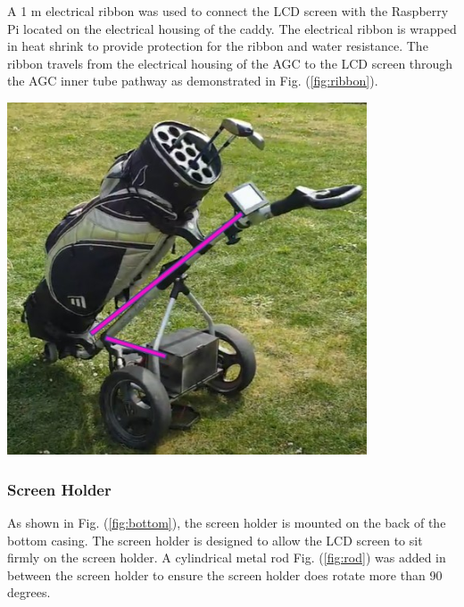 \documentclass[11pt,landscape]{article}
\newenvironment{Figure}
  {\par\medskip\noindent\minipage{\linewidth}}
  {\endminipage\par\medskip}
\begin{document}
\begin{multicols}{3}
    A 1 m electrical ribbon was used to connect the LCD screen with the
    Raspberry Pi located on the electrical housing of the caddy. The electrical
    ribbon is wrapped in heat shrink to provide protection for the ribbon and water
    resistance. The ribbon travels from the electrical housing of the AGC to
    the LCD screen through the AGC inner tube pathway as demonstrated in
     Fig. (\ref{fig:ribbon}).

    \begin{Figure}
        \begin{center}
            \includegraphics[width=0.8\textwidth]{Figure33.jpg}
            \label{fig:ribbon}
        \end{center}
    \end{Figure}
    
    \subsubsection{Screen Holder}
    As shown in Fig. (\ref{fig:bottom}), the screen holder is mounted on the
    back of the bottom casing. The screen holder is designed to allow the LCD
    screen to sit firmly on the screen holder. A
    cylindrical metal rod Fig. (\ref{fig:rod}) was added in between the
    screen holder to ensure the screen holder does rotate more than 90 degrees.
    

\end{multicols}
\end{document}
